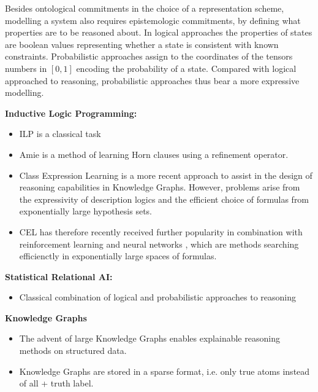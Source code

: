 Besides ontological commitments in the choice of a representation scheme, modelling a system also requires epistemologic commitments, by defining what properties are to be reasoned about.
In logical approaches the properties of states are boolean values representing whether a state is consistent with known constraints.
Probabilistic approaches assign to the coordinates of the tensors numbers in $[0,1]$ encoding the probability of a state.
Compared with logical approached to reasoning, probabilistic approaches thus bear a more expressive modelling.


\textbf{Inductive Logic Programming:}
\begin{itemize}
    \item ILP is a classical task \cite{muggleton_inductive_1994}
    \item Amie \cite{galarraga_amie_2013} is a method of learning Horn clauses using a refinement operator.
    \item Class Expression Learning \cite{lehmann_class_2011} is a more recent approach to assist in the design of reasoning capabilities in Knowledge Graphs.
        However, problems arise from the expressivity of description logics and the efficient choice of formulas from exponentially large hypothesis sets.
    \item CEL has therefore recently received further popularity in combination with reinforcement learning \cite{demir_drill-_2021} and neural networks \cite{kouagou_neural_2022, pesquita_neural_2023}, which are methods searching efficienctly in exponentially large spaces of formulas.
\end{itemize}

\textbf{Statistical Relational AI:}
\begin{itemize}
    \item Classical combination of logical and probabilistic approaches to reasoning \cite{getoor_introduction_2019}
\end{itemize}

\textbf{Knowledge Graphs}
\begin{itemize}
    \item The advent of large Knowledge Graphs enables explainable reasoning methods on structured data. \cite{antoniou_semantic_2012,hogan_knowledge_2021}
    \item Knowledge Graphs are stored in a sparse format, i.e. only true atoms instead of all + truth label.
\end{itemize}


